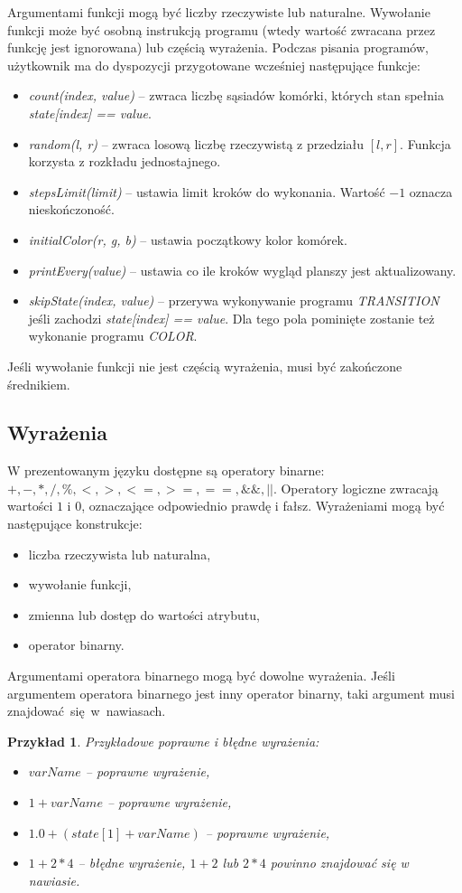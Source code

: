 \documentclass[declaration,shortabstract, inz]{iithesis}
\theoremstyle{definition} \newtheorem{definition}{Definicja}[]
\theoremstyle{plain} \newtheorem{remark}[definition]{Obserwacja}
\theoremstyle{plain} \newtheorem{theorem}[definition]{Twierdzenie}
\theoremstyle{plain} \newtheorem{example}{Przykład}[definition]
\theoremstyle{plain} \newtheorem{lemma}[definition]{Lemat}
\begin{document}
Argumentami funkcji mogą być liczby rzeczywiste lub naturalne. Wywołanie funkcji może być osobną instrukcją programu (wtedy wartość zwracana przez funkcję jest ignorowana) lub częścią wyrażenia.
Podczas pisania programów, użytkownik ma do dyspozycji przygotowane wcześniej następujące funkcje:
\begin{itemize}
\item \textit{count(index, value)} -- zwraca liczbę sąsiadów komórki, których stan spełnia \textit{state[index] == value}.
\item \textit{random(l, r)} -- zwraca losową liczbę rzeczywistą z przedziału $[l, r]$. Funkcja korzysta z rozkładu jednostajnego.
\item \textit{stepsLimit(limit)} -- ustawia limit kroków do wykonania. Wartość $-1$ oznacza nieskończoność.
\item \textit{initialColor(r, g, b)} -- ustawia początkowy kolor komórek.
\item \textit{printEvery(value)} -- ustawia co ile kroków wygląd planszy jest aktualizowany.
\item \textit{skipState(index, value)} -- przerywa wykonywanie programu \textit{TRANSITION} jeśli zachodzi \textit{state[index] == value}. Dla tego pola pominięte zostanie też wykonanie programu \textit{COLOR}.
\end{itemize}

Jeśli wywołanie funkcji nie jest częścią wyrażenia, musi być zakończone średnikiem.

\subsection{Wyrażenia}
W prezentowanym języku dostępne są operatory binarne: $+, -, * , /, \%, <, >, <=, >=, ==, \&\&, ||$.
Operatory logiczne zwracają wartości $1$ i $0$, oznaczające odpowiednio prawdę i fałsz.
Wyrażeniami mogą być następujące konstrukcje:
\begin{itemize}
\item liczba rzeczywista lub naturalna,
\item wywołanie funkcji,
\item zmienna lub dostęp do wartości atrybutu,
\item operator binarny.
\end{itemize}
Argumentami operatora binarnego mogą być dowolne wyrażenia. Jeśli argumentem operatora binarnego jest inny operator binarny, taki argument musi znajdować~się~w~nawiasach.

\begin{example}
Przykładowe poprawne i błędne wyrażenia:
\begin{itemize}
\item $varName$ -- poprawne wyrażenie,
\item $1 + varName$ -- poprawne wyrażenie,
\item $1.0 + (state[1] + varName)$ -- poprawne wyrażenie,
\item $1 + 2 * 4$ -- błędne wyrażenie, $1 + 2$ lub $2 * 4$ powinno znajdować się w nawiasie.
\end{itemize}
\end{example}
\end{document}
